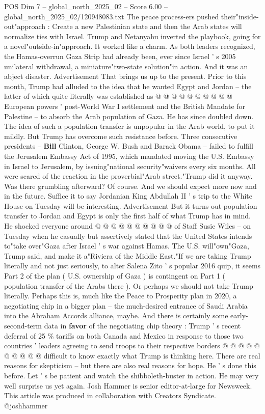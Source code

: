\begin{textsample}{POS Dim 7 – global\_north\_2025\_02 – Score 6.00 – global\_north\_2025\_02/120948083.txt}
The peace process-ers pushed their"inside-out"approach : Create a new Palestinian state and then the Arab states will normalize ties with Israel.
Trump and Netanyahu inverted the playbook, going for a novel"outside-in"approach.
It worked like a charm.
As both leaders recognized, the Hamas-overrun Gaza Strip had already been, ever since Israel ' s 2005 unilateral withdrawal, a miniature"two-state solution"in action.
And it was an abject disaster.
Advertisement That brings us up to the present.
Prior to this month, Trump had alluded to the idea that he wanted Egypt and Jordan -- the latter of which quite literally was established as @ @ @ @ @ @ @ @ @ @ European powers ' post-World War I settlement and the British Mandate for Palestine -- to absorb the Arab population of Gaza.
He has since doubled down.
The idea of such a population transfer is unpopular in the Arab world, to put it mildly.
But Trump has overcome such resistance before.
Three consecutive presidents -- \textbf{Bill} Clinton, George W.
Bush and Barack Obama -- failed to fulfill the Jerusalem Embassy Act of 1995, which mandated moving the U.S.
Embassy in Israel to Jerusalem, by issuing"national security"waivers every six months.
All were scared of the reaction in the proverbial"Arab street."Trump did it anyway.
Was there grumbling afterward?
Of course.
And we should expect more now and in the future.
Suffice it to say Jordanian King Abdullah II ' s trip to the White House on Tuesday will be interesting.
Advertisement But it turns out population transfer to Jordan and Egypt is only the first half of what Trump has in mind.
He shocked everyone around @ @ @ @ @ @ @ @ @ @ of Staff Susie Wiles -- on Tuesday when he casually but assertively stated that the United States intends to"take over"Gaza after Israel ' s war against Hamas.
The U.S. will"own"Gaza, Trump said, and make it a"Riviera of the Middle East."If we are taking Trump literally and not just seriously, to alter Salena Zito ' s popular 2016 quip, it seems Part 2 of the plan ( U.S. ownership of Gaza ) is contingent on Part 1 ( population transfer of the Arabs there ).
Or perhaps we should not take Trump literally.
Perhaps this is, much like the Peace to Prosperity plan in 2020, a negotiating chip in a bigger plan -- the much-desired entrance of Saudi Arabia into the Abraham Accords alliance, maybe.
And there is certainly some early-second-term data in \textbf{favor} of the negotiating chip theory : Trump ' s recent deferral of 25 \% tariffs on both Canada and Mexico in response to those two countries ' leaders agreeing to send troops to their respective borders @ @ @ @ @ @ @ @ @ @ difficult to know exactly what Trump is thinking here.
There are real reasons for skepticism -- but there are also real reasons for hope.
He ' s done this before.
Let ' s be patient and watch the shibboleth-buster in action.
He may very well surprise us yet again.
Josh Hammer is senior editor-at-large for Newsweek.
This article was produced in collaboration with Creators Syndicate. @joshhammer

\end{textsample}
